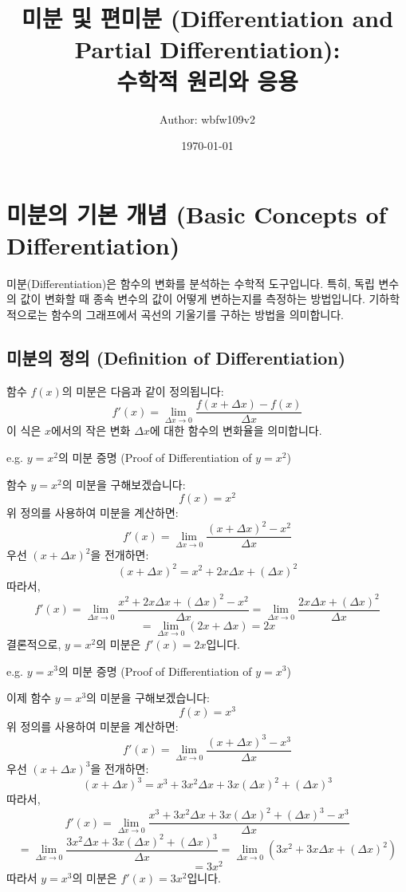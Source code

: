 \documentclass[12pt]{article}
\title{
    미분 및 편미분 (Differentiation and Partial Differentiation): \\
    수학적 원리와 응용
}
\author{Author: wbfw109v2}
\date{\today}
\begin{document}
\maketitle
\tableofcontents

\section{미분의 기본 개념 (Basic Concepts of Differentiation)}

\noindent 미분(Differentiation)은 함수의 변화를 분석하는 수학적 도구입니다. 특히, 독립 변수의 값이 변화할 때 종속 변수의 값이 어떻게 변하는지를 측정하는 방법입니다. 기하학적으로는 함수의 그래프에서 곡선의 기울기를 구하는 방법을 의미합니다.

\subsection{미분의 정의 (Definition of Differentiation)}

\noindent 함수 \( f(x) \)의 미분은 다음과 같이 정의됩니다:
\[
  f'(x) = \lim_{\Delta x \to 0} \frac{f(x + \Delta x) - f(x)}{\Delta x}
\]
이 식은 \( x \)에서의 작은 변화 \( \Delta x \)에 대한 함수의 변화율을 의미합니다.

\vspace{2\baselineskip}
\noindent {} e.g. \( y = x^2 \)의 미분 증명 (Proof of Differentiation of \( y = x^2 \))

\noindent 함수 \( y = x^2 \)의 미분을 구해보겠습니다:
\[
  f(x) = x^2
\]
위 정의를 사용하여 미분을 계산하면:
\[
  f'(x) = \lim_{\Delta x \to 0} \frac{(x + \Delta x)^2 - x^2}{\Delta x}
\]
우선 \( (x + \Delta x)^2 \)을 전개하면:
\[
  (x + \Delta x)^2 = x^2 + 2x\Delta x + (\Delta x)^2
\]
따라서,
\[
  f'(x) = \lim_{\Delta x \to 0} \frac{x^2 + 2x\Delta x + (\Delta x)^2 - x^2}{\Delta x} = \lim_{\Delta x \to 0} \frac{2x\Delta x + (\Delta x)^2}{\Delta x}
\]
\[
  = \lim_{\Delta x \to 0} (2x + \Delta x) = 2x
\]
결론적으로, \( y = x^2 \)의 미분은 \( f'(x) = 2x \)입니다.

\vspace{3\baselineskip}
\noindent {} e.g. \( y = x^3 \)의 미분 증명 (Proof of Differentiation of \( y = x^3 \))

\noindent 이제 함수 \( y = x^3 \)의 미분을 구해보겠습니다:
\[
  f(x) = x^3
\]
위 정의를 사용하여 미분을 계산하면:
\[
  f'(x) = \lim_{\Delta x \to 0} \frac{(x + \Delta x)^3 - x^3}{\Delta x}
\]
우선 \( (x + \Delta x)^3 \)을 전개하면:
\[
  (x + \Delta x)^3 = x^3 + 3x^2\Delta x + 3x(\Delta x)^2 + (\Delta x)^3
\]
따라서,
\[
  f'(x) = \lim_{\Delta x \to 0} \frac{x^3 + 3x^2\Delta x + 3x(\Delta x)^2 + (\Delta x)^3 - x^3}{\Delta x}
\]
\[
  = \lim_{\Delta x \to 0} \frac{3x^2\Delta x + 3x(\Delta x)^2 + (\Delta x)^3}{\Delta x} = \lim_{\Delta x \to 0} (3x^2 + 3x\Delta x + (\Delta x)^2)
\]
\[
  = 3x^2
\]
따라서 \( y = x^3 \)의 미분은 \( f'(x) = 3x^2 \)입니다.
\end{document}
